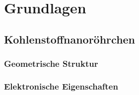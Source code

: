\chapter{Grundlagen}
\label{cha:grundlagen}

\section{Kohlenstoffnanoröhrchen}
\label{cha:kohlenstoffnanoroehrchen}

\subsection{Geometrische Struktur}
\label{geometrischestruktur}

\subsection{Elektronische Eigenschaften}
\label{elektronischeeigenschaften}